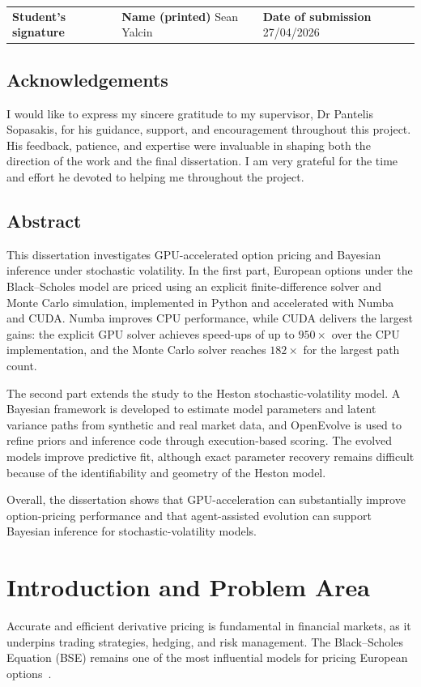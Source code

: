 \documentclass[11pt]{report}
\begin{document}
\noindent
\begin{tabular}{p{5cm} p{5cm} p{5cm}}
\textbf{Student's signature} & \textbf{Name (printed)} Sean Yalcin & \textbf{Date of submission} 27/04/2026 \\
\end{tabular}


\newpage
\section*{Acknowledgements}

I would like to express my sincere gratitude to my 
supervisor, Dr Pantelis Sopasakis, for his guidance,
support, and encouragement throughout this project. 
His feedback, patience, and expertise were invaluable 
in shaping both the direction of the work and the final 
dissertation. I am very grateful for the time and effort 
he devoted to helping me throughout the project.
\newpage
\section*{Abstract}
This dissertation investigates 
GPU-accelerated option pricing and Bayesian inference under 
stochastic volatility. In the first part, European options under 
the Black--Scholes model are priced using an explicit finite-difference 
solver and Monte Carlo simulation, implemented in Python and accelerated 
with Numba and CUDA. Numba improves CPU performance, while CUDA delivers 
the largest gains: the explicit GPU solver achieves speed-ups of up 
to $950\times$ over the CPU implementation, and the Monte Carlo solver 
reaches $182\times$ for the largest path count.

The second part extends the study to the Heston stochastic-volatility 
model. A Bayesian framework is developed to estimate model parameters 
and latent variance paths from synthetic and real market data, and 
OpenEvolve is used to refine priors and inference code through 
execution-based scoring. The evolved models improve predictive fit, 
although exact parameter recovery remains difficult because of the 
identifiability and geometry of the Heston model.

Overall, the dissertation shows that GPU-acceleration can 
substantially improve option-pricing performance and that 
agent-assisted evolution can support Bayesian inference for 
stochastic-volatility models.
\newpage
\tableofcontents
\newpage


\chapter{Introduction and Problem Area}
Accurate and efficient derivative pricing is fundamental
in financial markets, as it underpins trading strategies, 
hedging, and risk management. The Black--Scholes Equation (BSE) 
remains one of the most influential models for 
pricing European options~\cite{black1973pricing}.
\end{document}
